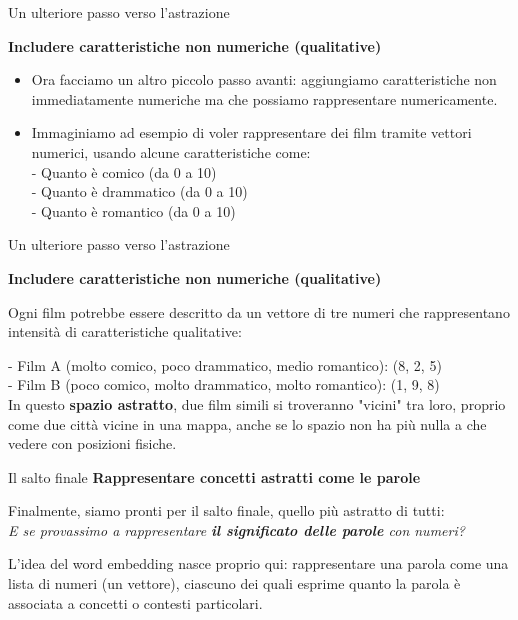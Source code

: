 \documentclass[aspectratio=169]{beamer}
\begin{document}
\begin{frame}{Un ulteriore passo verso l’astrazione}

\textbf{Includere caratteristiche non numeriche (qualitative)}\\
\vspace{0.5cm}
\begin{itemize}
\item Ora facciamo un altro piccolo passo avanti: aggiungiamo caratteristiche non immediatamente numeriche ma che possiamo rappresentare numericamente.
\item Immaginiamo ad esempio di voler rappresentare dei film tramite vettori numerici, usando alcune caratteristiche come:\\
\vspace{0.3cm}
- Quanto è comico (da 0 a 10)     \\ \vspace{0.2cm}
- Quanto è drammatico (da 0 a 10) \\ \vspace{0.2cm}
- Quanto è romantico (da 0 a 10)
\end{itemize}
\end{frame}
%
%
\begin{frame}{Un ulteriore passo verso l’astrazione}

\textbf{Includere caratteristiche non numeriche (qualitative)}\\
\vspace{0.5cm}

Ogni film potrebbe essere descritto da un vettore di tre numeri che rappresentano intensità di caratteristiche qualitative:

- Film A (molto comico, poco drammatico, medio romantico): (8, 2, 5)\\
- Film B (poco comico, molto drammatico, molto romantico): (1, 9, 8)\\
\vspace{0.5cm}
In questo \textbf{spazio astratto}, due film simili si troveranno "vicini" tra loro, proprio come due città vicine in una mappa, anche se lo spazio non ha più nulla a che vedere con posizioni fisiche.
\end{frame}
%
%
\begin{frame}{Il salto finale}
\textbf{Rappresentare concetti astratti come le parole}\\
\vspace{0.5cm}

Finalmente, siamo pronti per il salto finale, quello più astratto di tutti:\\
\vspace{0.3cm}
\emph{E se provassimo a rappresentare \textbf{il significato delle parole} con numeri?}\\
\vspace{0.3cm}

L'idea del word embedding nasce proprio qui: rappresentare una parola come una lista di numeri (un vettore), ciascuno dei quali esprime quanto la parola è associata a concetti o contesti particolari.
\end{frame}
\end{document}
